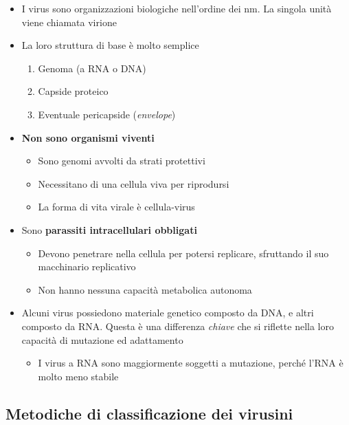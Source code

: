 \documentclass[italian,]{article}
\providecommand{\tightlist}{%
  \setlength{\itemsep}{0pt}\setlength{\parskip}{0pt}}
\begin{document}
\begin{itemize}
\tightlist
\item
  I virus sono organizzazioni biologiche nell'ordine dei nm. La singola
  unità viene chiamata virione
\item
  La loro struttura di base è molto semplice

  \begin{enumerate}
  \def\labelenumi{\arabic{enumi}.}
  \tightlist
  \item
    Genoma (a RNA o DNA)
  \item
    Capside proteico
  \item
    Eventuale pericapside (\emph{envelope})
  \end{enumerate}
\item
  \textbf{Non sono organismi viventi}

  \begin{itemize}
  \tightlist
  \item
    Sono genomi avvolti da strati protettivi
  \item
    Necessitano di una cellula viva per riprodursi
  \item
    La forma di vita virale è cellula-virus
  \end{itemize}
\item
  Sono \textbf{parassiti intracellulari obbligati}

  \begin{itemize}
  \tightlist
  \item
    Devono penetrare nella cellula per potersi replicare, sfruttando il
    suo macchinario replicativo
  \item
    Non hanno nessuna capacità metabolica autonoma
  \end{itemize}
\item
  Alcuni virus possiedono materiale genetico composto da DNA, e altri
  composto da RNA. Questa è una differenza \emph{chiave} che si riflette
  nella loro capacità di mutazione ed adattamento

  \begin{itemize}
  \tightlist
  \item
    I virus a RNA sono maggiormente soggetti a mutazione, perché l'RNA è
    molto meno stabile
  \end{itemize}
\end{itemize}

\hypertarget{metodiche-di-classificazione-dei-virusini}{%
\subsection{Metodiche di classificazione dei
virusini}\label{metodiche-di-classificazione-dei-virusini}}
\end{document}
